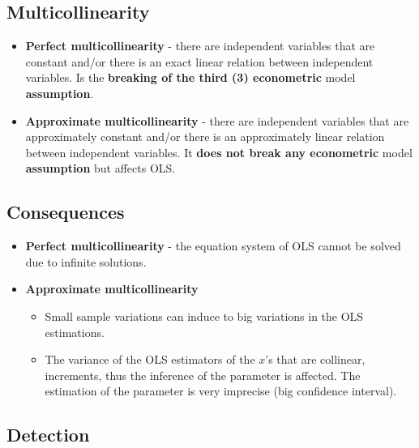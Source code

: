 \documentclass[10pt, a4paper, landscape]{article}
\begin{document}
\begin{multicols}{3}
\columnbreak

\section*{Multicollinearity}

\begin{itemize}[leftmargin=*]
	\item \textbf{Perfect multicollinearity} - there are independent variables that are constant and/or there is an exact linear relation between independent variables. Is the \textbf{breaking of the third (3) econometric} model \textbf{assumption}.
	\item \textbf{Approximate multicollinearity} - there are independent variables that are approximately constant and/or there is an approximately linear relation between independent variables. It \textbf{does not break any econometric} model \textbf{assumption} but affects OLS.
\end{itemize}

\subsection*{Consequences}

\begin{itemize}[leftmargin=*]
	\item \textbf{Perfect multicollinearity} - the equation system of OLS cannot be solved due to infinite solutions.
	\item \textbf{Approximate multicollinearity}
	\begin{itemize}[leftmargin=*]
		\item Small sample variations can induce to big variations in the OLS estimations.
		\item The variance of the OLS estimators of the \( x \)'s that are collinear, increments, thus the inference of the parameter is affected. The estimation of the parameter is very imprecise (big confidence interval).
	\end{itemize}
\end{itemize}

\subsection*{Detection}


\end{multicols}
\end{document}

